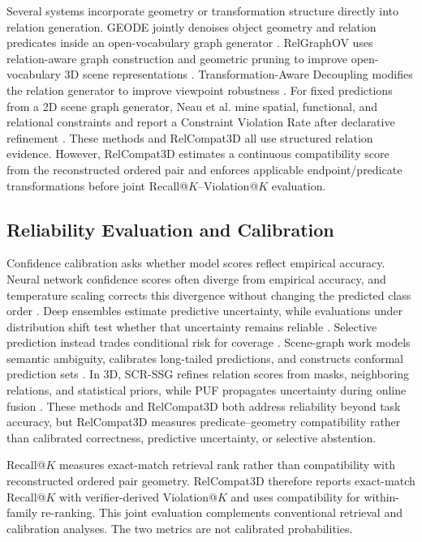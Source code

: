 Several systems incorporate geometry or transformation structure directly into relation generation. GEODE jointly denoises object geometry and relation predicates inside an open-vocabulary graph generator \cite{feng2026geode}. RelGraphOV uses relation-aware graph construction and geometric pruning to improve open-vocabulary 3D scene representations \cite{chen2026beyond}. Transformation-Aware Decoupling modifies the relation generator to improve viewpoint robustness \cite{sun2026not}. For fixed predictions from a 2D scene graph generator, Neau et al. mine spatial, functional, and relational constraints and report a Constraint Violation Rate after declarative refinement \cite{neau2026visual}. These methods and RelCompat3D all use structured relation evidence. However, RelCompat3D estimates a continuous compatibility score from the reconstructed ordered pair and enforces applicable endpoint/predicate transformations before joint Recall@$K$--Violation@$K$ evaluation. 

\subsection{Reliability Evaluation and Calibration}
Confidence calibration asks whether model scores reflect empirical accuracy. Neural network confidence scores often diverge from empirical accuracy, and temperature scaling corrects this divergence without changing the predicted class order \cite{guo2017calibration}. Deep ensembles estimate predictive uncertainty, while evaluations under distribution shift test whether that uncertainty remains reliable \cite{lakshminarayanan2017simple,ovadia2019can}. Selective prediction instead trades conditional risk for coverage \cite{geifman2017selective}. Scene-graph work models semantic ambiguity, calibrates long-tailed predictions, and constructs conformal prediction sets \cite{yang2021probabilistic,zhu2024calibration,nag2025conformal}. In 3D, SCR-SSG refines relation scores from masks, neighboring relations, and statistical priors, while PUF propagates uncertainty during online fusion \cite{yeo2025statistical,yang2026puf}. These methods and RelCompat3D both address reliability beyond task accuracy, but RelCompat3D measures predicate--geometry compatibility rather than calibrated correctness, predictive uncertainty, or selective abstention.

Recall@$K$ measures exact-match retrieval rank rather than compatibility with reconstructed ordered pair geometry. RelCompat3D therefore reports exact-match Recall@$K$ with verifier-derived Violation@$K$ and uses compatibility for within-family re-ranking. This joint evaluation complements conventional retrieval and calibration analyses. The two metrics are not calibrated probabilities.



